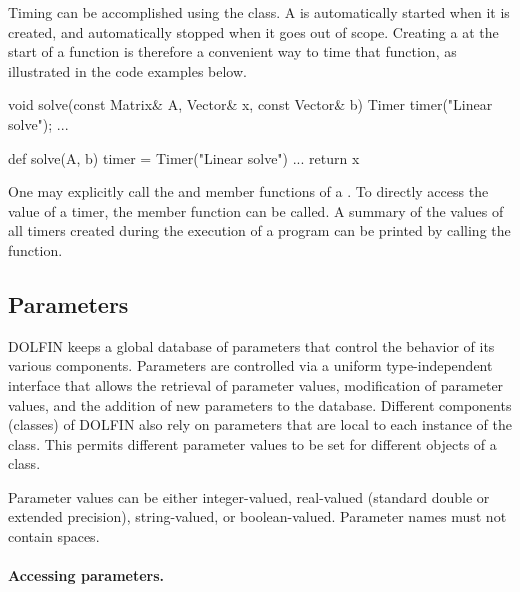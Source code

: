 Timing can be accomplished using the  class. A  is
automatically started when it is created, and automatically stopped when
it goes out of scope. Creating a  at the start of a function
is therefore a convenient way to time that function, as illustrated in
the code examples below.
\begin{c++}
void solve(const Matrix& A, Vector& x, const Vector& b)
{
  Timer timer("Linear solve");
  ...
}
\end{c++}
\begin{python}
def solve(A, b)
{
  timer = Timer("Linear solve")
  ...
  return x
}
\end{python}
One may explicitly call the  and  member
functions of a . To directly access the value of a timer,
the  member function can be called. A summary of the
values of all timers created during the execution of a program can be
printed by calling the  function.

\subsection{Parameters}

DOLFIN keeps a global database of parameters that control the behavior
of its various components. Parameters are controlled via a uniform
type-independent interface that allows the retrieval of parameter
values, modification of parameter values, and the addition of new
parameters to the database. Different components (classes) of DOLFIN
also rely on parameters that are local to each instance of the class.
This permits different parameter values to be set for different
objects of a class.

Parameter values can be either integer-valued, real-valued (standard
double or extended precision), string-valued, or boolean-valued. Parameter
names must not contain spaces.

\paragraph{Accessing parameters.}


